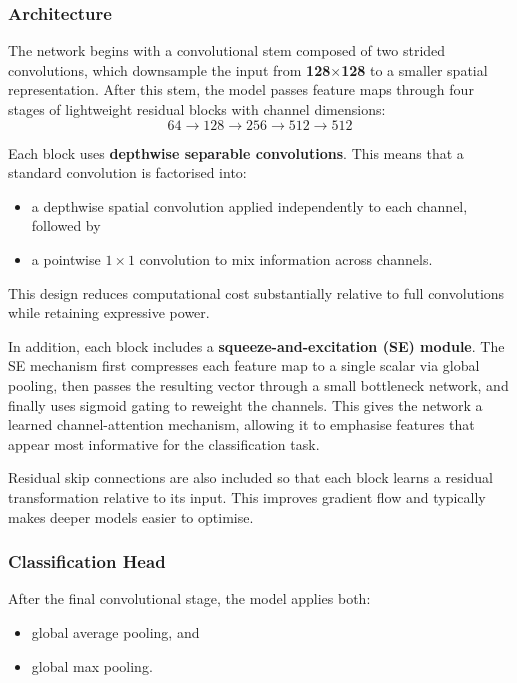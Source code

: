 \documentclass{article}
\begin{document}
\subsubsection{Architecture}

The network begins with a convolutional stem composed of two strided convolutions, which downsample the input from \textbf{128$\times$128} to a smaller spatial representation. After this stem, the model passes feature maps through four stages of lightweight residual blocks with channel dimensions:
\[64 \rightarrow 128 \rightarrow 256 \rightarrow 512 \rightarrow 512\]

Each block uses \textbf{depthwise separable convolutions}. This means that a standard convolution is factorised into:
\begin{itemize}
    \item a depthwise spatial convolution applied independently to each channel, followed by
    \item a pointwise $1\times1$ convolution to mix information across channels.
\end{itemize}

This design reduces computational cost substantially relative to full convolutions while retaining expressive power.

In addition, each block includes a \textbf{squeeze-and-excitation (SE) module}. The SE mechanism first compresses each feature map to a single scalar via global pooling, then passes the resulting vector through a small bottleneck network, and finally uses sigmoid gating to reweight the channels. This gives the network a learned channel-attention mechanism, allowing it to emphasise features that appear most informative for the classification task.

Residual skip connections are also included so that each block learns a residual transformation relative to its input. This improves gradient flow and typically makes deeper models easier to optimise.

\subsubsection{Classification Head}

After the final convolutional stage, the model applies both:
\begin{itemize}
    \item global average pooling, and
    \item global max pooling.
\end{itemize}
\end{document}
